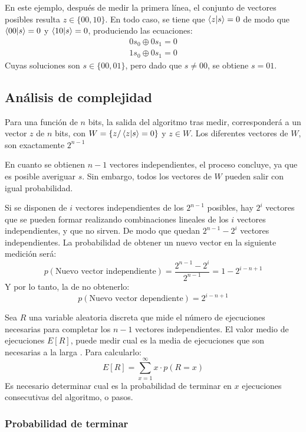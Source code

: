 En este ejemplo, después de medir la primera línea, el conjunto de vectores 
posibles resulta $z \in \{00, 10\}$. En todo caso, se tiene que $\braket{z|s} = 
0$ de modo que $\braket{00|s} = 0$ y $\braket{10|s} = 0$, produciendo las 
ecuaciones:
%
\begin{equation}
\begin{split}
	0 s_0 \oplus 0 s_1 = 0 \\
	1 s_0 \oplus 0 s_1 = 0
\end{split}
\end{equation}
%
Cuyas soluciones son $s \in \{00, 01\}$, pero dado que $s \neq 00$, se obtiene 
$s = 01$.

\subsection{Análisis de complejidad}

Para una función de $n$ bits, la salida del algoritmo tras medir, corresponderá 
a un vector $z$ de $n$ bits, con $W = \{z / \braket{z|s} = 0\}$ y $z \in W$. Los 
diferentes vectores de $W$, son exactamente $2^{n-1}$

En cuanto se obtienen $n-1$ vectores independientes, el proceso concluye, ya que 
es posible averiguar $s$. Sin embargo, todos los vectores de $W$ pueden salir 
con igual probabilidad.

Si se disponen de $i$ vectores independientes de los $2^{n-1}$ posibles, hay 
$2^i$ vectores que se pueden formar realizando combinaciones lineales de los $i$ 
vectores independientes, y que no sirven. De modo que quedan $2^{n-1} - 2^i$ 
vectores independientes. La probabilidad de obtener un nuevo vector en la 
siguiente medición será:
$$ p(\text{Nuevo vector independiente}) = \frac{2^{n-1} - 2^i}{2^{n-1}} = 1 - 
2^{i-n+1} $$
Y por lo tanto, la de no obtenerlo:
$$ p(\text{Nuevo vector dependiente}) = 2^{i-n+1} $$

Sea $R$ una variable aleatoria discreta que mide el número de ejecuciones 
necesarias para completar los $n-1$ vectores independientes. El valor medio de 
ejecuciones $E[R]$, puede medir cual es la media de ejecuciones que son 
necesarias a la larga \cite{ross99}. Para calcularlo:
%
$$ E[R] = \sum^{\infty}_{x=1} x \cdot p(R=x) $$
%
Es necesario determinar cual es la probabilidad de terminar en $x$ ejecuciones 
consecutivas del algoritmo, o pasos.

\subsubsection{Probabilidad de terminar}

